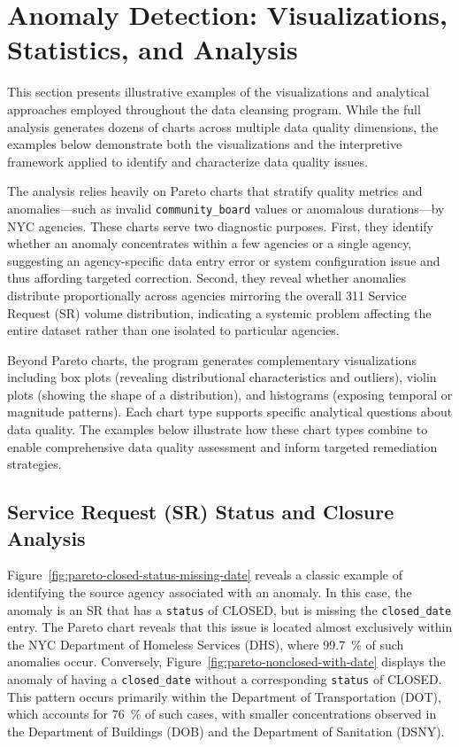 \documentclass[linenumber]{jdsart}
\begin{document}
\section{Anomaly Detection: Visualizations, Statistics, and Analysis}


This section presents illustrative examples of the visualizations and analytical 
approaches employed throughout the data cleansing program. While the full analysis 
generates dozens of charts across multiple data quality dimensions, the examples 
below demonstrate both the visualizations and the interpretive framework 
applied to identify and characterize data quality issues.

The analysis relies heavily on Pareto charts that stratify quality metrics and 
anomalies—such as invalid \texttt{community\_board} values or 
anomalous durations—by NYC agencies. These charts serve two diagnostic
purposes. First, they identify whether an anomaly concentrates within a few agencies or a 
single agency, suggesting an agency-specific data entry error or system 
configuration issue and thus affording targeted correction. Second, 
they reveal whether anomalies distribute proportionally across agencies 
mirroring the overall 311 Service Request (SR) volume distribution, 
indicating a systemic problem affecting the entire dataset rather than 
one isolated to particular agencies.

Beyond Pareto charts, the program generates complementary visualizations including 
box plots (revealing distributional characteristics and outliers), violin plots 
(showing the shape of a distribution), and histograms (exposing temporal 
or magnitude patterns). Each chart type supports specific analytical 
questions about data quality. The examples below illustrate how these chart types 
combine to enable comprehensive data quality assessment and inform targeted 
remediation strategies.


\subsection{Service Request (SR) Status and Closure Analysis}


Figure~\ref{fig:pareto-closed-status-missing-date} reveals a classic 
example of identifying the source agency associated with an anomaly. 
In this case, the anomaly is an SR that has a \texttt{status}
of CLOSED, but is missing the \texttt{closed\_date} entry. The Pareto chart reveals that
this issue is located almost exclusively within the NYC Department of Homeless Services (DHS),
where \SI[round-mode=places, round-precision=1]{99.7}{\percent}
of such anomalies occur. Conversely, Figure~\ref{fig:pareto-nonclosed-with-date}
displays the anomaly of having a \texttt{closed\_date}
without a corresponding \texttt{status} of CLOSED.
This pattern occurs primarily within the
Department of Transportation (DOT),
which accounts for
\SI[round-mode=places, round-precision=0]{76}{\percent}
of such cases, with smaller concentrations observed
in the Department of Buildings (DOB)
and the Department of Sanitation (DSNY).
\end{document}
